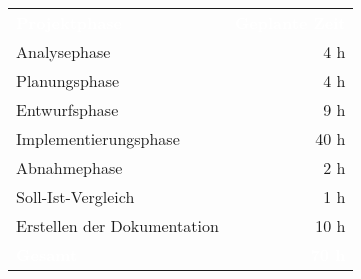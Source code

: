 \begin{tabular}{lr}
\rowcolor{heading}\textcolor{white}{\textbf{Projektphase}} &
\textcolor{white}{\textbf{Geplante Zeit}} \\
Analysephase & 4 h \\
\rowcolor{odd}Planungsphase & 4 h \\
Entwurfsphase & 9 h \\
\rowcolor{odd}Implementierungsphase & 40 h \\
Abnahmephase & 2 h \\
\rowcolor{odd}Soll-Ist-Vergleich & 1 h \\
Erstellen der Dokumentation & 10 h \\
\hline
\hline
\rowcolor{heading}\textcolor{white}{\textbf{Gesamt}} &
\textcolor{white}{\textbf{70 h}} \\
\end{tabular}

